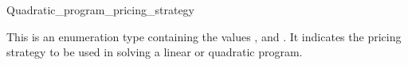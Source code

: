 \begin{ccRefClass}{Quadratic_program_pricing_strategy}


\ccDefinition
This is an enumeration type containing the values
, and . 
It indicates the pricing strategy to be used in
solving a linear or quadratic program.

\ccSeeAlso

\end{ccRefClass}
